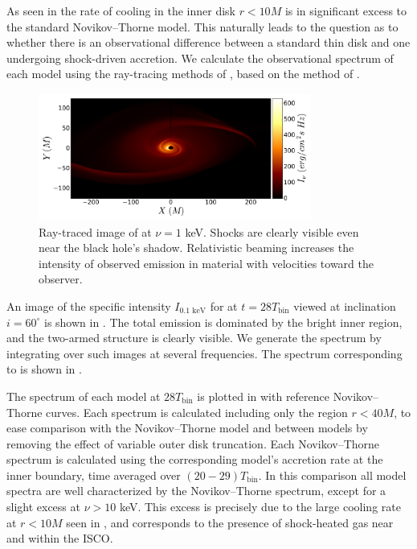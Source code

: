 As seen in  the rate of cooling in the inner disk $r < 10M$ is in significant excess to the standard Novikov--Thorne model.  This naturally leads to the question as to whether there is an observational difference between a standard thin disk and one undergoing shock-driven accretion.  We calculate the observational spectrum of each model using the ray-tracing methods of , based on the method of \cite{Kulkarni11}.

\begin{figure}
	\begin{center}
	\includegraphics[width=0.8\textwidth]{figures/minidisk/q011_m3_im.pdf}
	\end{center}
	\caption{ Ray-traced image of  at $\nu =   1$ keV. Shocks are clearly visible even near the black hole's shadow.  Relativistic beaming increases the intensity of observed emission in material with velocities toward the observer.}
\end{figure}

An image of the specific intensity $I_{0.1\text{ keV}}$ for  at $t=28 T_\text{bin}$ viewed at inclination $i=60^\circ$ is shown in .  The total emission is dominated by the bright inner region, and the two-armed structure is clearly visible. We generate the spectrum by integrating over such images at several frequencies.  The spectrum corresponding to  is shown in . 

The spectrum of each model at $28 T_\text{bin}$ is plotted in  with reference Novikov--Thorne curves.  Each spectrum is calculated including only the region $r<40M$, to ease comparison with the Novikov--Thorne model and between models by removing the effect of variable outer disk truncation.  Each Novikov--Thorne spectrum is calculated using the corresponding model's accretion rate at the inner boundary, time averaged over $(20-29)T_\text{bin}$.  In this comparison all model spectra are well characterized by the Novikov--Thorne spectrum, except for a slight excess at $\nu > 10$ keV.  This excess is precisely due to the large cooling rate at $r<10M$ seen in , and corresponds to the presence of shock-heated gas near and within the ISCO.  

